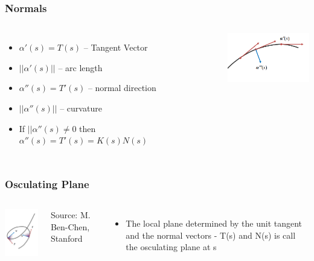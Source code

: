 \documentclass[10pt]{beamer}
\begin{document}
\begin{frame}
  \frametitle{Normals}
  \begin{columns}
    \column{7cm}
    \begin{itemize}
    \item $\alpha'(s) = T(s)$ -- Tangent Vector
    \item $||\alpha'(s)||$ -- arc length
    \item $\alpha''(s) = T'(s)$ -- normal direction
    \item $||\alpha''(s)||$ -- curvature
    \item If $||\alpha''(s) \neq 0$ then $\alpha''(s) = T'(s) = K(s) N(s)$
    \end{itemize}
    \column{4cm}
    \vfill
    \centerline{\includegraphics[width=3.8cm]{normals}}
    \vfill
  \end{columns}
\end{frame}

\begin{frame}
  \frametitle{Osculating Plane}
  \begin{columns}
    \column{4cm}
    \vfill
    \centerline{\includegraphics[width=3.5cm]{osculating-plane}}
    \vfill
    Source: M. Ben-Chen, Stanford
    \column{7cm}
    \begin{itemize}
    \item The local plane determined by the unit tangent and the
      normal vectors - T(s) and N(s) is call the osculating plane at s
    \end{itemize}
  \end{columns}
\end{frame}
\end{document}
